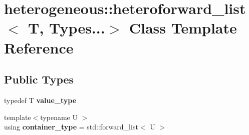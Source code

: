 \hypertarget{classheterogeneous_1_1heteroforward__list_3_01_t_00_01_types_8_8_8_4}{}\section{heterogeneous\+:\+:heteroforward\+\_\+list$<$ T, Types...$>$ Class Template Reference}
\label{classheterogeneous_1_1heteroforward__list_3_01_t_00_01_types_8_8_8_4}
\subsection*{Public Types}
\begin{DoxyCompactItemize}
\item 
\hypertarget{classheterogeneous_1_1heteroforward__list_3_01_t_00_01_types_8_8_8_4_ab699af44d4bc9bc0b679122c1002f62f}{}typedef T {\bfseries value\+\_\+type}\label{classheterogeneous_1_1heteroforward__list_3_01_t_00_01_types_8_8_8_4_ab699af44d4bc9bc0b679122c1002f62f}

\item 
\hypertarget{classheterogeneous_1_1heteroforward__list_3_01_t_00_01_types_8_8_8_4_a7968ce926da2dbda10f2c87370950bc0}{}{\footnotesize template$<$typename U $>$ }\\using {\bfseries container\+\_\+type} = std\+::forward\+\_\+list$<$ U $>$\label{classheterogeneous_1_1heteroforward__list_3_01_t_00_01_types_8_8_8_4_a7968ce926da2dbda10f2c87370950bc0}

\end{DoxyCompactItemize}
